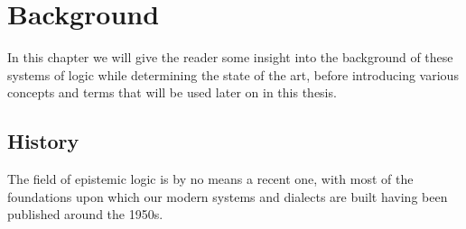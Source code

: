 \section{Background}\label{sec:back}

In this chapter we will give the reader some insight into the background of these systems of logic while determining the state of the art, before introducing various concepts and terms that will be used later on in this thesis.


\subsection{History}


%



The field of epistemic logic is by no means a recent one, with most of the foundations upon which our modern systems and dialects are built having been published around the 1950s.\cite{StanfordEpiLogic}



